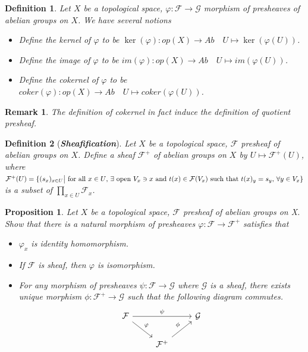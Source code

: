 \documentclass{ctexart}
\newtheorem{definition}{Definition}[section]
\newtheorem{remark}{Remark}[section]
\newtheorem{proposition}{Proposition}[section]
\begin{document}
\begin{definition}
    Let $X$ be a topological space, $\varphi: \mathcal{F} \longrightarrow \mathcal{G}$ morphism of presheaves of abelian groups on $X$.
    We have several notions
    \begin{itemize}
        \item Define the kernel of $\varphi$ to be $\ker(\varphi): op(X) \longrightarrow Ab\quad U \longmapsto \ker(\varphi(U))$.
        \item Define the image of $\varphi$ to be $im(\varphi): op(X) \longrightarrow Ab\quad U \longmapsto im(\varphi(U))$.
        \item Define the cokernel of $\varphi$ to be $coker(\varphi): op(X) \longrightarrow Ab\quad U \longmapsto coker(\varphi(U))$.
    \end{itemize}
\end{definition}
\begin{remark}
    The definition of cokernel in fact induce the definition of quotient presheaf.
\end{remark}
\begin{definition}[\textbf{\emph{Sheafification}}]
    Let $X$ be a topological space, $\mathcal{F}$ presheaf of abelian groups on $X$.
    Define a sheaf $\mathcal{F}^{+}$ of abelian groups on $X$ by $U \longmapsto \mathcal{F}^{+}(U)$, 
    where $\mathcal{F}^{+}(U) = \{(s_{x})_{x\in U} \big{|} \text{ for all $x\in U$, $\exists$ \text{open} $V_{x}\ni x$ and $t(x)\in \mathcal{F}(V_{x})$ such that $t(x)_{y} = s_{y}$, $\forall y\in V_{x}$}\}$ is a subset of $\prod_{x\in U} \mathcal{F}_{x}$.
\end{definition}
\begin{proposition}
    Let $X$ be a topological space, $\mathcal{F}$ presheaf of abelian groups on X.
    Show that there is a natural morphism of presheaves $\varphi: \mathcal{F} \longrightarrow \mathcal{F}^{+}$ satisfies that
    \begin{itemize}
        \item $\varphi_{x}$ is identity homomorphism.
        \item If $\mathcal{F}$ is sheaf, then $\varphi$ is isomorphism.
        \item For any morphism of presheaves $\psi: \mathcal{F} \longrightarrow \mathcal{G}$ where $\mathcal{G}$ is a sheaf,
        there exists unique morphism $\phi: \mathcal{F}^{+} \longrightarrow \mathcal{G}$ such that the following diagram commutes.
        \begin{equation}
            \begin{tikzcd}
                \mathcal{F} \arrow[rr, "\psi"] \arrow[dr, "\varphi"] &&
                \mathcal{G} \\
                & \mathcal{F}^{+} \arrow[ur, "\phi"] &
            \end{tikzcd}
        \end{equation}
    \end{itemize}
    \label{Proposition 1.7}
\end{proposition}
\end{document}
